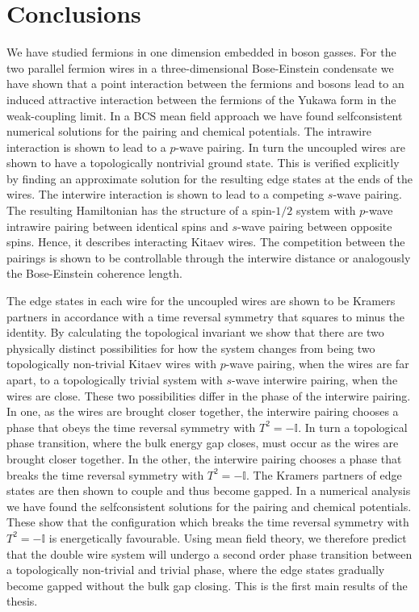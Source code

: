 \documentclass[9pt, twoside]{Thesis}
\begin{document}
\newpage



\part{Conclusions}
\fancyhead[LE,RO]{\thepage}
\chead{}
We have studied fermions in one dimension embedded in boson gasses. For the two parallel fermion wires in a three-dimensional Bose-Einstein condensate we have shown that a point interaction between the fermions and bosons lead to an induced attractive interaction between the fermions of the Yukawa form in the weak-coupling limit. In a BCS mean field approach we have found selfconsistent numerical solutions for the pairing and chemical potentials. The intrawire interaction is shown to lead to a $p$-wave pairing. In turn the uncoupled wires are shown to have a topologically nontrivial ground state. This is verified explicitly by finding an approximate solution for the resulting edge states at the ends of the wires. The interwire interaction is shown to lead to a competing $s$-wave pairing. The resulting Hamiltonian has the structure of a spin-$1/2$ system with $p$-wave intrawire pairing between identical spins and $s$-wave pairing between opposite spins. Hence, it describes interacting Kitaev wires. The competition between the pairings is shown to be controllable through the interwire distance or analogously the Bose-Einstein coherence length. 

The edge states in each wire for the uncoupled wires are shown to be Kramers partners in accordance with a time reversal symmetry that squares to minus the identity. By calculating the topological invariant we show that there are two physically distinct possibilities for how the system changes from being two topologically non-trivial Kitaev wires with $p$-wave pairing, when the wires are far apart, to a topologically trivial system with $s$-wave interwire pairing, when the wires are close. These two possibilities differ in the phase of the interwire pairing. In one, as the wires are brought closer together, the interwire pairing chooses a phase that obeys the time reversal symmetry with $T^2 = -\mathbb{I}$. In turn a topological phase transition, where the bulk energy gap closes, must occur as the wires are brought closer together. In the other, the interwire pairing chooses a phase that breaks the time reversal symmetry with $T^2 = -\mathbb{I}$. The Kramers partners of edge states are then shown to couple and thus become gapped. In a numerical analysis we have found the selfconsistent solutions for the pairing and chemical potentials. These show that the configuration which breaks the time reversal symmetry with $T^2 = -\mathbb{I}$ is energetically favourable. Using mean field theory, we therefore predict that the double wire system will undergo a second order phase transition between a topologically non-trivial and trivial phase, where the edge states gradually become gapped without the bulk gap closing. This is the first main results of the thesis. 
\end{document}
